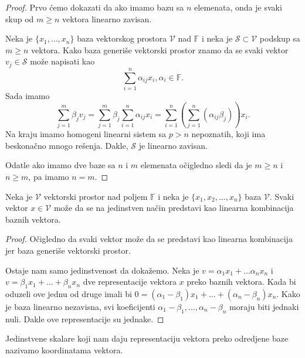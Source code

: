 \documentclass{article}
\begin{document}
\begin{proof}
  Prvo ćemo dokazati da ako imamo bazu sa $n$ elemenata, onda je svaki skup od $m \ge n$ vektora linearno zavisan.
  
  Neka je $\{x_1, \ldots, x_n\}$ baza vektorskog prostora $\mathcal{V}$ nad $\mathbb{F}$ i neka je $\mathcal{S} \subset \mathcal{V}$ podskup sa $m \ge n$ vektora.
  Kako baza generiše vektorski prostor znamo da se svaki vektor $v_j \in \mathcal{S}$ može napisati kao
  \[\sum_{i = 1}^{n} \alpha_{ij} x_i, \alpha_i \in \mathbb{F}.\]
  Sada imamo
  \[\sum_{j = 1}^{m} \beta_j v_j = \sum_{j = 1}^{m} \beta_j \sum_{i = 1}^{n} \alpha_{ij} x_i = \sum_{i = 1}^{n} (\sum_{j = 1}^{n} (\alpha_{ij} \beta_j)) x_i.\]
  Na kraju imamo homogeni linearni sistem sa $p > n$ nepoznatih, koji ima beskonačno mnogo rešenja.
  Dakle, $\mathcal{S}$ je linearno zavisan.

  Odatle ako imamo dve baze sa $n$ i $m$ elemenata očigledno sledi da je $m \ge n$ i $n \ge m$, pa imamo $n = m$.
\end{proof}

\begin{theorem}
  Neka je $\mathcal{V}$ vektorski prostor nad poljem $\mathbb{F}$ i neka je $\{x_1, x_2, \ldots, x_n\}$ baza $\mathcal{V}$.
  Svaki vektor $x \in \mathcal{V}$ može da se na jedinstven način predstavi kao linearna kombinacija baznih vektora.
\end{theorem}

\begin{proof}
  Očigledno da svaki vektor može da se predstavi kao linearna kombinacija jer baza generiše vektorski prostor.

  Ostaje nam samo jedinstvenost da dokažemo.
  Neka je $v = \alpha_1 x_1 + \ldots \alpha_n x_n$ i $ v = \beta_1 x_1 + \ldots + \beta_n x_n$ dve representacije vektora $x$ preko baznih vektora.
  Kada bi oduzeli ove jednu od druge imali bi $0 = (\alpha_1 - \beta_1) x_1 + \ldots + (\alpha_n - \beta_n) x_n$.
  Kako je baza linearno nezavisna, svi koeficijenti $\alpha_1 - \beta_1, \ldots, \alpha_n - \beta_n$ moraju biti jednaki nuli.
  Dakle ove representacije su jednake.
\end{proof}

Jedinstvene skalare koji nam daju representaciju vektora preko odredjene baze nazivamo koordinatama vektora.
\end{document}
